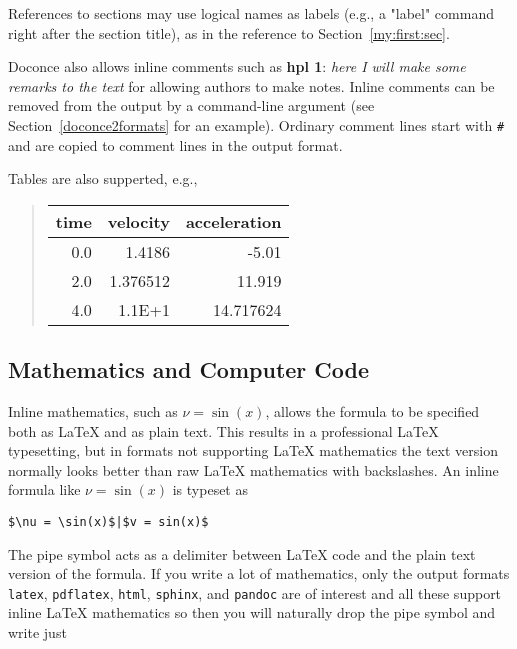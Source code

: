 \documentclass[%
oneside,                 %
final,                   %
10pt]{article}
\newcommand{\shortinlinecomment}[3]{{\bf #1}: \emph{#2}}
\begin{document}
References to sections may use logical names as labels (e.g., a
"label" command right after the section title), as in the reference to
Section~\ref{my:first:sec}.

Doconce also allows inline comments such as \shortinlinecomment{hpl 1}{ here I will make
some remarks to the text }{ here I will make } for allowing authors to make notes. Inline
comments can be removed from the output by a command-line argument
(see Section~\ref{doconce2formats} for an example). Ordinary comment
lines start with {\fontsize{10pt}{10pt}\Verb!#!} and are copied to comment lines in the
output format.

Tables are also supperted, e.g.,


\begin{quote}\begin{tabular}{rrr}
\hline
\multicolumn{1}{c}{ time } & \multicolumn{1}{c}{ velocity } & \multicolumn{1}{c}{ acceleration } \\
\hline
0.0          & 1.4186       & -5.01        \\
2.0          & 1.376512     & 11.919       \\
4.0          & 1.1E+1       & 14.717624    \\
\hline
\end{tabular}\end{quote}

\noindent
\subsection{Mathematics and Computer Code}

Inline mathematics, such as $\nu = \sin(x)$,
allows the formula to be specified both as {\LaTeX} and as plain text.
This results in a professional {\LaTeX} typesetting, but in formats
not supporting {\LaTeX} mathematics
the text version normally looks better than raw {\LaTeX} mathematics with
backslashes. An inline formula like $\nu = \sin(x)$ is
typeset as

\begin{Verbatim}[fontsize=\fontsize{9pt}{9pt},tabsize=8,baselinestretch=0.85,fontfamily=tt,xleftmargin=7mm]
$\nu = \sin(x)$|$v = sin(x)$
\end{Verbatim}
\noindent
The pipe symbol acts as a delimiter between {\LaTeX} code and the plain text
version of the formula. If you write a lot of mathematics, only the
output formats {\fontsize{10pt}{10pt}\Verb!latex!}, {\fontsize{10pt}{10pt}\Verb!pdflatex!}, {\fontsize{10pt}{10pt}\Verb!html!}, {\fontsize{10pt}{10pt}\Verb!sphinx!}, and {\fontsize{10pt}{10pt}\Verb!pandoc!}
are of interest
and all these support inline {\LaTeX} mathematics so then you will naturally
drop the pipe symbol and write just
\end{document}
